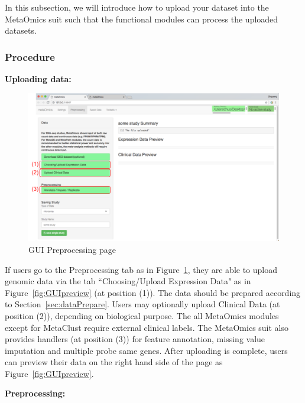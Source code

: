 In this subsection, we will introduce how to upload your dataset into the MetaOmics suit such that the functional modules can process the uploaded datasets.


\subsubsection{Procedure}
\label{sec:procedure}

\begin{steps}
\item \textbf{Uploading data:}

\begin{figure}[!htbp]
\begin{center}
\includegraphics[scale=0.35]{./figure/preprocessing/GUIpreprocessing}
\caption{GUI Preprocessing page}
\label{fig:GUIpreprocessing}
\end{center}
\end{figure}

If users go to the Preprocessing tab as in Figure~\ref{fig:GUIpreprocessing},
they are able to upload genomic data via the tab ``Choosing/Upload Expression Data" as in Figure~\ref{fig:GUIpreview} (at position {\color{red} (1)}).
The data should be prepared according to Section~\ref{sec:dataPrepare}.
Users may optionally upload Clinical Data (at position {\color{red} (2)}), depending on biological purpose.
The all MetaOmics modules except for MetaClust  require external clinical labels.
The MetaOmics suit also provides handlers (at position {\color{red} (3)}) for feature annotation, missing value imputation and multiple probe same genes.
After uploading is complete,
users can preview their data on the right hand side of the page as Figure~\ref{fig:GUIpreview}.

\item \textbf{Preprocessing:}



\end{steps}
